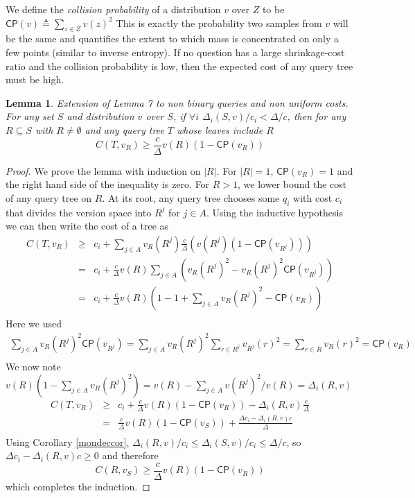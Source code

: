 \documentclass{article}
\newtheorem{lemma}{Lemma}
\begin{document}
We define the \emph{
collision probability} of a distribution $v$ over $Z$ to be
$\mathsf{CP}(v) \triangleq \sum_{z \in Z} v(z)^2 $ 
This is exactly the probability two samples  from $v$ will be the same
and quantifies the extent to which mass is concentrated on only 
a few points (similar to inverse entropy).
If no question has a large shrinkage-cost ratio and
the collision probability is low, then
the expected cost of any query tree must be high.
\begin{lemma} Extension of Lemma 7 \citep{greedy} to non binary queries
and non uniform costs.
For any set $S$ and distribution $v$ over $S$,  
if $\forall i$ $\Delta_i(S, v)/c_i < \Delta / c$, 
then for any $R \subseteq S$ with $R \neq \emptyset$
and any query tree $T$ whose leaves include $R$
\[ C(T, v_R) \geq \frac{c}{\Delta} v(R) (1 - \mathsf{CP}(v_R)) \]
\label{costlma}
\end{lemma}
\begin{proof}
We prove the lemma with induction on $|R|$.  For $|R|=1$, 
$\mathsf{CP}(v_R) = 1$ and the right hand side of the inequality is zero.  
For $R>1$, we lower bound the cost of any query tree
on $R$.  At its root, any query tree chooses some $q_i$ with cost
$c_i$ that divides the version space into $R^j$ for $j \in A$.
Using the inductive hypothesis we can then write the
cost of a tree as
\begin{eqnarray*}
C(T,v_R) & \geq & 
c_i + \sum_{j \in A} v_R(R^j) \frac{c}{\Delta} 
(v(R^j)(1 - \mathsf{CP}(v_{R^j}))) \\
& = & c_i + \frac{c}{\Delta} v(R) 
\sum_{j \in A} (v_R(R^j)^2 - v_R(R^j)^2 \mathsf{CP}(v_{R^j}) ) \\
& = & c_i + \frac{c}{\Delta} v(R) 
(1 - 1 + \sum_{j \in A} v_R(R^j)^2 - \mathsf{CP}(v_R)) \\
\end{eqnarray*}
Here we used 
\begin{align*}
\sum_{j \in A} v_R(R^j)^2 \mathsf{CP}(v_{R^j}) 
= \sum_{j \in A} v_R(R^j)^2 \sum_{r \in R^j} v_{R^j}(r)^2 
= \sum_{r \in R} v_R(r)^2 = \mathsf{CP}(v_R) \\
\end{align*}
We now note $v(R)(1 - \sum_{j \in A} v_R(R^j)^2) = 
v(R) - \sum_{j \in A} v(R^j)^2/v(R) = \Delta_i(R, v)$
\begin{eqnarray*}
C(T,v_R) & \geq & c_i + \frac{c}{\Delta} v(R) (1 - \mathsf{CP}(v_R)) 
- \Delta_i(R, v) \frac{c}{\Delta} \\
& = & \frac{c}{\Delta}v(R) (1 - \mathsf{CP}(v_S)) 
+ \frac{\Delta c_i - \Delta_i(R, v) c}{\Delta} \\
\end{eqnarray*}
Using Corollary \ref{mondeccor}, $\Delta_i(R, v) / c_i \leq 
\Delta_i(S, v) / c_i \leq \Delta / c$, 
so $\Delta c_i - \Delta_i(R, v) c \geq 0$ and therefore
\[ C(R,v_S) \geq \frac{c}{\Delta} v(R) (1 - \mathsf{CP}(v_R)) \]
which completes the induction.
\end{proof}
\end{document}
